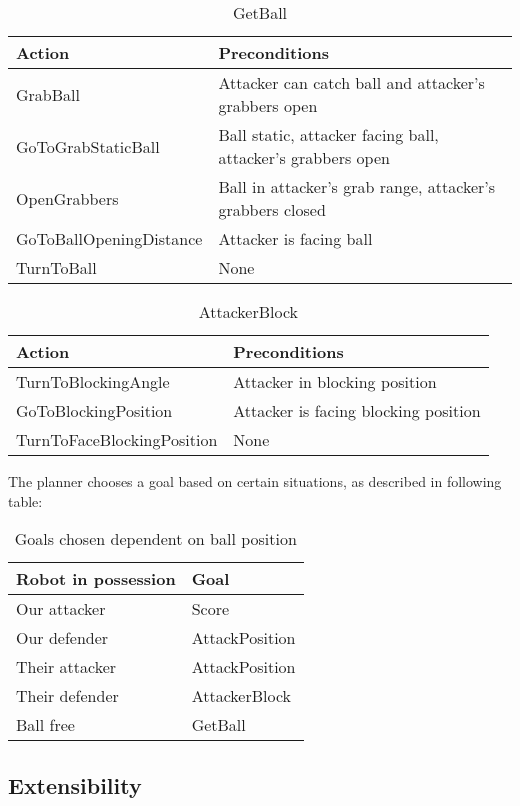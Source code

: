 \begin{table}[H]
\centering
\caption{GetBall}
\begin{tabular}{ | l | l | }
\hline
Action & Preconditions \\ \hline
GrabBall & Attacker can catch ball and attacker's grabbers open \\ \hline
GoToGrabStaticBall & Ball static, attacker facing ball, attacker's grabbers open \\ \hline
OpenGrabbers & Ball in attacker's grab range, attacker's grabbers closed \\ \hline
GoToBallOpeningDistance & Attacker is facing ball \\ \hline
TurnToBall & None \\
\hline
\end{tabular}
\end{table}


\begin{table}[H]
\centering
\caption{AttackerBlock}

\begin{tabular}{ | l | l | }
\hline
Action & Preconditions \\ \hline
TurnToBlockingAngle & Attacker in blocking position \\ \hline
GoToBlockingPosition & Attacker is facing blocking position \\ \hline
TurnToFaceBlockingPosition & None \\
\hline
\end{tabular}
\end{table}


The planner chooses a goal based on certain situations, as described in following table:



\begin{table}[H]
\centering
\caption{Goals chosen dependent on ball position}
\begin{tabular}{ | l | l | }
\hline
Robot in possession & Goal \\ \hline
Our attacker & Score \\
Our defender & AttackPosition \\
Their attacker & AttackPosition \\
Their defender & AttackerBlock \\
Ball free & GetBall \\
\hline
\end{tabular}
\end{table}


\subsection{Extensibility}

